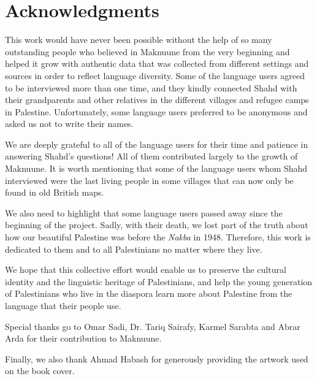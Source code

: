 \documentclass[11pt]{book}
\begin{document}

\pagestyle{empty} %

\tableofcontents %


\chapter{Acknowledgments}
This work would have never been possible without the help of so many outstanding people who believed in Maknuune from the very beginning and helped it grow with authentic data that was collected from different settings and sources in order to reflect language diversity. Some of the language users agreed to be interviewed more than one time, and they kindly connected Shahd with their grandparents and other relatives in the different villages and refugee camps in Palestine. Unfortunately, some language users preferred to be anonymous and asked us not to write their names.

We are deeply grateful to all of the language users for their time and patience in answering Shahd's questions! All of them contributed largely to the growth of Maknuune. It is worth mentioning that some of the language users whom Shahd interviewed were the last living people in some villages that can now only be found in old British maps.

We also need to highlight that some language users passed away since the beginning of the project. Sadly, with their death, we lost part of the truth about how our beautiful Palestine was before the \textit{Nakba} in 1948. Therefore, this work is dedicated to them and to all Palestinians no matter where they live.

We hope that this collective effort would enable us to preserve the cultural identity and the linguistic heritage of Palestinians, and help the young generation of Palestinians who live in the diaspora learn more about Palestine from the language that their people use.

\vspace{5mm}
Special thanks go to Omar Sadi, Dr. Tariq Sairafy, Karmel Sarabta and Abrar Arda for their contribution to Maknuune. 

\vspace{5mm}
Finally, we also thank Ahmad Habash for generously providing the artwork used on the book cover.
\end{document}
